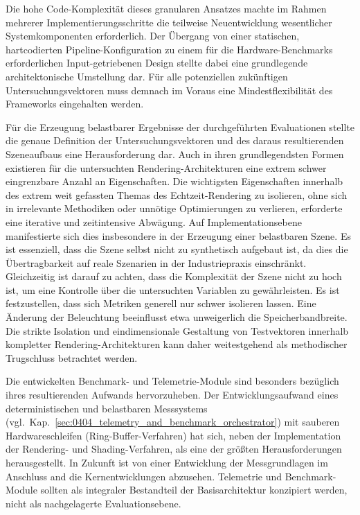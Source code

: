 Die hohe Code-Komplexität dieses granularen Ansatzes machte im Rahmen mehrerer Implementierungsschritte die teilweise
Neuentwicklung wesentlicher Systemkomponenten erforderlich.
Der Übergang von einer statischen, hartcodierten Pipeline-Konfiguration zu einem für die Hardware-Benchmarks
erforderlichen Input-getriebenen Design stellte dabei eine grundlegende architektonische Umstellung dar.
Für alle potenziellen zukünftigen Untersuchungsvektoren muss demnach im Voraus eine Mindestflexibilität des Frameworks
eingehalten werden.

Für die Erzeugung belastbarer Ergebnisse der durchgeführten Evaluationen stellte die genaue Definition der
Untersuchungsvektoren und des daraus resultierenden Szeneaufbaus eine Herausforderung dar.
Auch in ihren grundlegendsten Formen existieren für die untersuchten Rendering-Architekturen eine extrem schwer
eingrenzbare Anzahl an Eigenschaften.
Die wichtigsten Eigenschaften innerhalb des extrem weit gefassten Themas des Echtzeit-Rendering zu isolieren, ohne sich
in irrelevante Methodiken oder unnötige Optimierungen zu verlieren, erforderte eine iterative und zeitintensive
Abwägung.
Auf Implementationsebene manifestierte sich dies insbesondere in der Erzeugung einer belastbaren Szene.
Es ist essenziell, dass die Szene selbst nicht zu synthetisch aufgebaut ist, da dies die Übertragbarkeit auf
reale Szenarien in der Industriepraxis einschränkt.
Gleichzeitig ist darauf zu achten, dass die Komplexität der Szene nicht zu hoch ist, um eine Kontrolle über die
untersuchten Variablen zu gewährleisten.
Es ist festzustellen, dass sich Metriken generell nur schwer isolieren lassen.
Eine Änderung der Beleuchtung beeinflusst etwa unweigerlich die Speicherbandbreite.
Die strikte Isolation und eindimensionale Gestaltung von Testvektoren innerhalb kompletter
Rendering-Architekturen kann daher weitestgehend als methodischer Trugschluss betrachtet werden.

Die entwickelten Benchmark- und Telemetrie-Module sind besonders bezüglich ihres resultierenden Aufwands hervorzuheben.
Der Entwicklungsaufwand eines deterministischen und belastbaren Messsystems
(vgl.\ Kap.~\ref{sec:0404_telemetry_and_benchmark_orchestrator}) mit sauberen Hardwareschleifen (Ring-Buffer-Verfahren) hat
sich, neben der Implementation der Rendering- und Shading-Verfahren, als eine der größten Herausforderungen
herausgestellt.
In Zukunft ist von einer Entwicklung der Messgrundlagen im Anschluss and die Kernentwicklungen abzusehen.
Telemetrie und Benchmark-Module sollten als integraler Bestandteil der Basisarchitektur konzipiert werden, nicht als
nachgelagerte Evaluationsebene.

